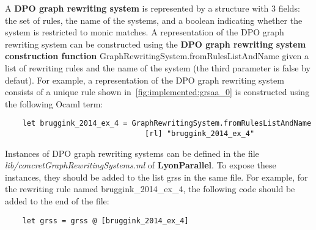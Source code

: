 A \textbf{DPO graph rewriting system} is represented by a structure with 3 fields: the set of rules, the name of the systems, and a boolean indicating whether the system is restricted to monic matches. A representation of the DPO graph rewriting system
can be constructed using the \textbf{DPO graph rewriting system construction function} \colorbox{Ivory2}{GraphRewritingSystem.fromRulesListAndName} given a list of rewriting rules and the name of the system (the third parameter is false by defaut). For example, a representation of the DPO graph rewriting system consists of a unique rule shown in~\autoref{fig:implemented:grsaa_0} is constructed using the following Ocaml term:
\begin{verbatim}
    let bruggink_2014_ex_4 = GraphRewritingSystem.fromRulesListAndName 
                                [rl] "bruggink_2014_ex_4"
\end{verbatim}

Instances of DPO graph rewriting systems can be defined in the file \textit{lib/concretGraphRewritingSystems.ml} of \textbf{LyonParallel}. To expose these instances, they should be added to the list \colorbox{Ivory2}{grss} in the same file. For example, for the rewriting rule named \colorbox{Ivory2}{bruggink\_2014\_ex\_4}, the following code should be added to the end of the file:
\begin{verbatim}
    let grss = grss @ [bruggink_2014_ex_4] 
\end{verbatim}

